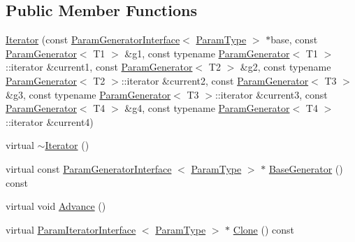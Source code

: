 \subsection*{\-Public \-Member \-Functions}
\begin{DoxyCompactItemize}
\item 
\hyperlink{classtesting_1_1internal_1_1CartesianProductGenerator4_1_1Iterator_a472b0297208a65433a8708bea0b08961}{\-Iterator} (const \hyperlink{classtesting_1_1internal_1_1ParamGeneratorInterface}{\-Param\-Generator\-Interface}$<$ \hyperlink{classtesting_1_1internal_1_1CartesianProductGenerator4_a99c0f82cb1095cf66d28100490e9fa39}{\-Param\-Type} $>$ $\ast$base, const \hyperlink{classtesting_1_1internal_1_1ParamGenerator}{\-Param\-Generator}$<$ \-T1 $>$ \&g1, const typename \hyperlink{classtesting_1_1internal_1_1ParamGenerator}{\-Param\-Generator}$<$ \-T1 $>$\-::iterator \&current1, const \hyperlink{classtesting_1_1internal_1_1ParamGenerator}{\-Param\-Generator}$<$ \-T2 $>$ \&g2, const typename \hyperlink{classtesting_1_1internal_1_1ParamGenerator}{\-Param\-Generator}$<$ \-T2 $>$\-::iterator \&current2, const \hyperlink{classtesting_1_1internal_1_1ParamGenerator}{\-Param\-Generator}$<$ \-T3 $>$ \&g3, const typename \hyperlink{classtesting_1_1internal_1_1ParamGenerator}{\-Param\-Generator}$<$ \-T3 $>$\-::iterator \&current3, const \hyperlink{classtesting_1_1internal_1_1ParamGenerator}{\-Param\-Generator}$<$ \-T4 $>$ \&g4, const typename \hyperlink{classtesting_1_1internal_1_1ParamGenerator}{\-Param\-Generator}$<$ \-T4 $>$\-::iterator \&current4)
\item 
virtual \hyperlink{classtesting_1_1internal_1_1CartesianProductGenerator4_1_1Iterator_a47b331bac1d130f2bab2c40e76ccb54a}{$\sim$\-Iterator} ()
\item 
virtual const \*
\hyperlink{classtesting_1_1internal_1_1ParamGeneratorInterface}{\-Param\-Generator\-Interface}\*
$<$ \hyperlink{classtesting_1_1internal_1_1CartesianProductGenerator4_a99c0f82cb1095cf66d28100490e9fa39}{\-Param\-Type} $>$ $\ast$ \hyperlink{classtesting_1_1internal_1_1CartesianProductGenerator4_1_1Iterator_a297272d14c33d1d5423da2a4776f895b}{\-Base\-Generator} () const 
\item 
virtual void \hyperlink{classtesting_1_1internal_1_1CartesianProductGenerator4_1_1Iterator_aaa5a890708f89affa1a7726cf152c872}{\-Advance} ()
\item 
virtual \hyperlink{classtesting_1_1internal_1_1ParamIteratorInterface}{\-Param\-Iterator\-Interface}\*
$<$ \hyperlink{classtesting_1_1internal_1_1CartesianProductGenerator4_a99c0f82cb1095cf66d28100490e9fa39}{\-Param\-Type} $>$ $\ast$ \hyperlink{classtesting_1_1internal_1_1CartesianProductGenerator4_1_1Iterator_a4bee4982ee1152c6935ffd0c2d749421}{\-Clone} () const 

\end{DoxyCompactItemize}
